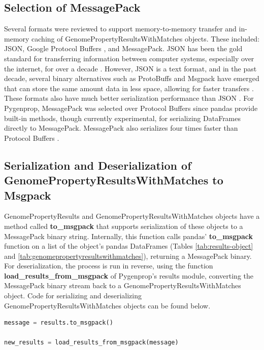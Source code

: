 \subsection{Selection of MessagePack}

Several formats were reviewed to support memory-to-memory transfer and in-memory caching of GenomePropertyResultsWithMatches objects. These included: JSON, Google Protocol Buffers \cite{varda2008protocol}, and MessagePack. JSON has been the gold standard for transferring information between computer systems, especially over the internet, for over a decade \cite{d4_softwareltd_2017}. However, JSON is a text format, and in the past decade, several binary alternatives such as ProtoBuffs and Msgpack have emerged that can store the same amount data in less space, allowing for faster transfers \cite{furuhashi2013messagepack,varda2008protocol,krebs_2017,cooper_2010,bengtsson_24AD}. These formats also have much better serialization performance than JSON \cite{krebs_2017,cooper_2010,bengtsson_24AD}. For Pygenprop, MessagePack was selected over Protocol Buffers since pandas provide built-in methods, though currently experimental, for serializing DataFrames directly to MessagePack. MessagePack also serializes four times faster than Protocol Buffers \cite{cooper_2010}.

\subsection{Serialization and Deserialization of GenomePropertyResultsWithMatches to Msgpack}

GenomePropertyResults and GenomePropertyResultsWithMatches objects have a method called \textbf{to\_msgpack} that supports serialization of these objects to a MessagePack binary string. Internally, this function calls pandas' \textbf{to\_msgpack} function on a list of the object's pandas DataFrames (Tables \ref{tab:results-object} and \ref{tab:genomepropertyresultswithmatches}), returning a MessagePack binary. For deserialization, the process is run in reverse, using the function \textbf{load\_results\_from\_msgpack} of Pygenprop's results module, converting the MessagePack binary stream back to a GenomePropertyResultsWithMatches object. Code for serializing and deserializing GenomePropertyResultsWithMatches objects can be found below.

\begin{lstlisting}[language=Python]  
message = results.to_msgpack()

new_results = load_results_from_msgpack(message)
\end{lstlisting}

